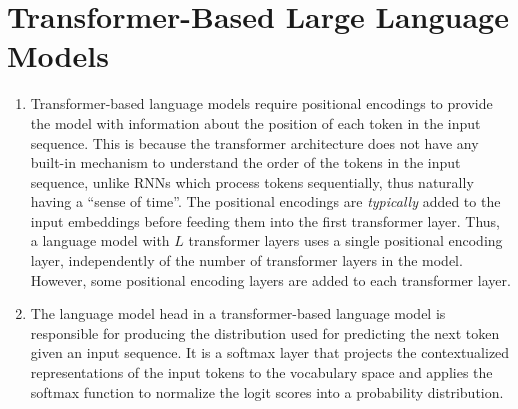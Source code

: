 \documentclass[11pt,a4paper]{article}
\begin{document}
\section{Transformer-Based Large Language Models}

\begin{enumerate}[label=(\alph*)]
    \item Transformer-based language models require positional encodings to
          provide the model with information about the position of each token in
          the input sequence.
          This is because the transformer architecture does not have any
          built-in mechanism to understand the order of the tokens in the input
          sequence, unlike RNNs which process tokens sequentially, thus
          naturally having a ``sense of time''.
          The positional encodings are \emph{typically} added to the input
          embeddings before feeding them into the first transformer layer.
          Thus, a language model with $L$ transformer layers uses a single
          positional encoding layer, independently of the number of transformer
          layers in the model.
          However, some positional encoding layers are added to each transformer
          layer.
    \item The language model head in a transformer-based language model is
          responsible for producing the distribution used for predicting the
          next token given an input sequence.
          It is a softmax layer that projects the contextualized representations
          of the input tokens to the vocabulary space and applies the softmax
          function to normalize the logit scores into a probability
          distribution.


\end{enumerate}
\end{document}
